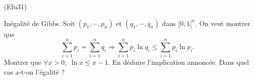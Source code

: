 \begin{tiny}(Efu31)\end{tiny} Inégalité de Gibbs.\newline
Soit $(p_1,\cdots,p_n)$ et $(q_1,\cdots, q_n)$  dans $]0,1[^n$.\newline
On veut montrer que
\begin{displaymath}
  \sum_{i=1}^n p_i = \sum_{i=1}^n q_i 
  \Rightarrow 
  \sum_{i=1}^n p_i\ln q_i \leq \sum_{i=1}^n p_i \ln p_i .
\end{displaymath}
 Montrer que $\forall x >0, \; \ln x \leq x -1$. En déduire l'implication annoncée. Dans quel cas a-t-on l'égalité ?

